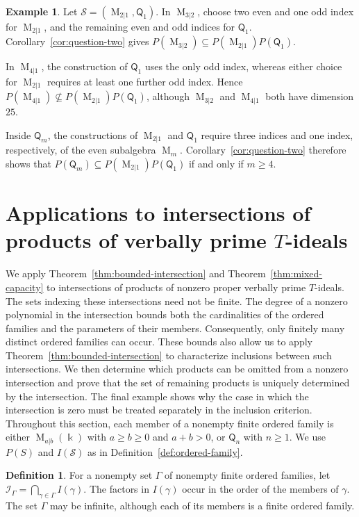 \documentclass[11pt,reqno]{amsart}
\newcommand{\kk}{\Bbbk}
\newcommand{\Mat}{\operatorname{M}}
\newcommand{\Qtype}{\mathsf Q}
\theoremstyle{definition}
\newtheorem{definition}[theorem]{Definition}
\newtheorem{example}[theorem]{Example}
\theoremstyle{remark}
\numberwithin{equation}{section}
\begin{document}
\begin{example}\label{ex:mixed-capacity}
Let $\mathcal S=(\Mat_{2|1},\Qtype_1)$.
In $\Mat_{3|2}$, choose two even and one odd index for
$\Mat_{2|1}$, and the remaining even and odd indices
for $\Qtype_1$.
Corollary~\ref{cor:question-two} gives
$P(\Mat_{3|2})\subseteq P(\Mat_{2|1})P(\Qtype_1)$.

In $\Mat_{4|1}$, the construction of $\Qtype_1$ uses
the only odd index, whereas either choice for
$\Mat_{2|1}$ requires at least one further odd index.
Hence
$P(\Mat_{4|1})\not\subseteq P(\Mat_{2|1})P(\Qtype_1)$,
although $\Mat_{3|2}$ and $\Mat_{4|1}$ both have
dimension $25$.

Inside $\Qtype_m$, the constructions of $\Mat_{2|1}$ and
$\Qtype_1$ require three indices and one index, respectively,
of the even subalgebra $\Mat_m$.
Corollary~\ref{cor:question-two} therefore shows that
$
P(\Qtype_m)\subseteq P(\Mat_{2|1})P(\Qtype_1)
$ if and only if $m\geq4$.

\end{example}


\section{Applications to intersections of products
of verbally prime \texorpdfstring{$T$}{T}-ideals}
\label{sec:antichains}

We apply Theorem~\ref{thm:bounded-intersection}
and Theorem~\ref{thm:mixed-capacity} to intersections of products
of nonzero proper verbally prime $T$-ideals.
The sets indexing these intersections need not be finite.
The degree of a nonzero polynomial in the intersection
bounds both the cardinalities of the ordered families
and the parameters of their members.
Consequently, only finitely many distinct ordered families
can occur. These bounds also allow us to apply
Theorem~\ref{thm:bounded-intersection} to characterize
inclusions between such intersections.
We then determine which products can be omitted from
a nonzero intersection and prove that the set of
remaining products is uniquely determined by the
intersection. 
The final example shows why the case in which the intersection is zero must be treated separately in the
inclusion criterion.
Throughout this section, each member of a nonempty finite ordered family
is either $\Mat_{a|b}(\kk)$ with $a\geq b\geq0$ and $a+b>0$,
or $\Qtype_n$ with $n\geq1$.
We use $P(S)$ and $I(\mathcal S)$ as in
Definition~\ref{def:ordered-family}.

\begin{definition}\label{def:family-intersection}
For a nonempty set $\Gamma$ of nonempty finite  ordered families, let
$\mathcal I_\Gamma=\bigcap_{\gamma\in\Gamma}I(\gamma)$.
The factors in $I(\gamma)$ occur in the order of the members
of $\gamma$.
The set $\Gamma$ may be infinite, although each of its
members is a finite ordered family.
\end{definition}
\end{document}
